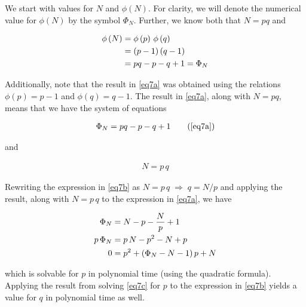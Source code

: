 \documentclass[../CryptoHW3.tex]{subfiles}
\begin{document}
\begin{flushleft}



  We start with values for $N$ and $\phi \left( N \right)$.  For clarity, we will denote the numerical value for $\phi \left( N \right)$ by the symbol $\Phi_N$.  Further, we know both that $N = p q$ and 

\begin{align}
  \phi \left( N \right) &= \phi \left( p \right) \, \phi \left( q \right) \notag \\
  &= \left( p - 1 \right) \left( q - 1 \right) \notag \\
  &= pq - p - q + 1 = \Phi_N \label{eq7a}
\end{align}

Additionally, note that the result in \ref{eq7a} was obtained using the relations $\phi \left( p \right) = p - 1$ and $\phi \left( q \right) = q - 1$.  The result in \ref{eq7a}, along with $N = p q$, means that we have the system of equations

\begin{align}
  \Phi_N = pq - p - q + 1 \tag{\ref{eq7a}}
\end{align}

and

\begin{align}
  N = p \, q \label{eq7b}
\end{align}

Rewriting the expression in \ref{eq7b} as $N = p \, q \; \Rightarrow \; q = N / p$ and applying the result, along with $N = p \, q$ to the expression in \ref{eq7a}, we have

\begin{align}
  \Phi_N &= N - p - \frac{N}{p} + 1 \notag \\
  p \, \Phi_N &= p \, N - p^2 - N + p \notag \\
  0 &= p^2 + \left( \Phi_N - N - 1 \right) p + N \label{eq7c}
\end{align}

which is solvable for $p$ in polynomial time (using the quadratic formula).  Applying the result from solving \ref{eq7c} for $p$ to the expression in \ref{eq7b} yields a value for $q$ in polynomial time as well.
























\end{flushleft}
\end{document}
